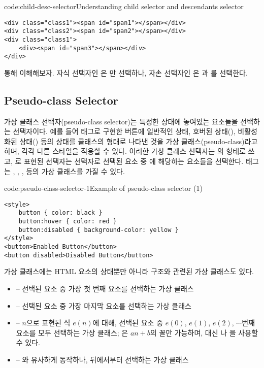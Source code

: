 \begin{codeenv}{code:child-desc-selector}{Understanding child selector and descendants selector}\begin{verbatim}
<div class="class1"><span id="span1"></span></div>
<div class="class2"><span id="span2"></span></div>
<div class="class1">
    <div><span id="span3"></span></div>
</div>
\end{verbatim}
\end{codeenv}
\clearpage

\를 통해 이해해보자. 자식 선택자인 은 만 선택하나, 자손 선택자인 은 과 를 선택한다.

\subsection*{Pseudo-class Selector}

가상 클래스 선택자(pseudo-class selector)는 특정한 상태에 놓여있는 요소들을 선택하는 선택자이다. 예를 들어  태그로 구현한 버튼에 일반적인 상태, 호버된 상태(), 비활성화된 상태() 등의 상태를 클래스의 형태로 나타낸 것을 가상 클래스(pseudo-class)라고 하며, 각각 다른 스타일을 적용할 수 있다. 이러한 가상 클래스 선택자는 의 형태로 쓰고, 로 표현된 선택자는  선택자로 선택된 요소 중 에 해당하는 요소들을 선택한다.  태그는 , , ,  등의 가상 클래스를 가질 수 있다.

\begin{codeenv}{code:pseudo-class-selector-1}{Example of pseudo-class selector (1)}\begin{verbatim}
<style>
    button { color: black }
    button:hover { color: red }
    button:disabled { background-color: yellow }
</style>
<button>Enabled Button</button>
<button disabled>Disabled Button</button>
\end{verbatim}
\end{codeenv}

가상 클래스에는 HTML 요소의 상태뿐만 아니라 구조와 관련된 가상 클래스도 있다.

\begin{itemize}
    \item {} – 선택된 요소 중 가장 첫 번째 요소를 선택하는 가상 클래스
    \item {} – 선택된 요소 중 가장 마지막 요소를 선택하는 가상 클래스
    \item {} – $n$으로 표현된 식 $e(n)$에 대해, 선택된 요소 중 $e(0)$, $e(1)$, $e(2)$, $\cdots$번째 요소를 모두 선택하는 가상 클래스; 은 $an+b$의 꼴만 가능하며,  대신 나 을 사용할 수 있다.
    \item {} – 와 유사하게 동작하나, 뒤에서부터 선택하는 가상 클래스
\end{itemize}


